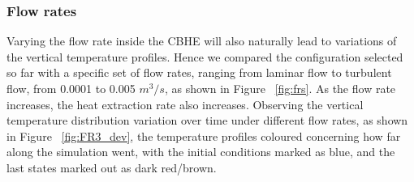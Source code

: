     \subsubsection{Flow rates}
        Varying the flow rate inside the CBHE will also naturally lead to variations of the vertical temperature profiles. Hence we compared the configuration selected so far with a specific set of flow rates, ranging from laminar flow to turbulent flow, from 0.0001 to 0.005 $m^3/s$, as shown in Figure ~\ref{fig:frs}. As the flow rate increases, the heat extraction rate also increases. Observing the vertical temperature distribution variation over time under different flow rates, as shown in Figure ~\ref{fig:FR3_dev}, the temperature profiles coloured concerning how far along the simulation went, with the initial conditions marked as blue, and the last states marked out as dark red/brown.
        
